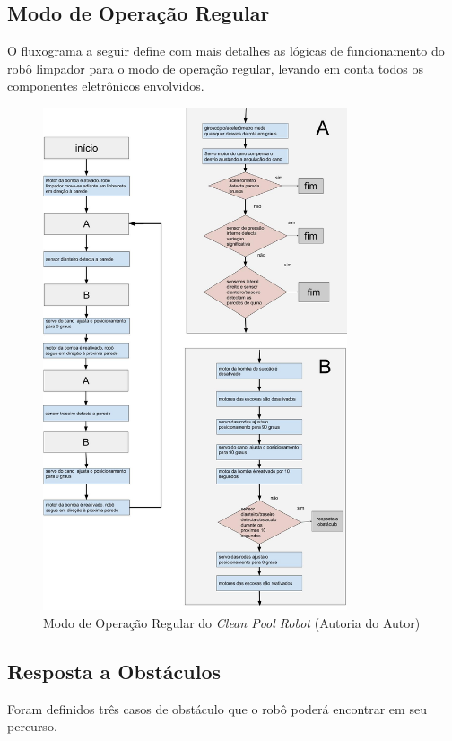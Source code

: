 \subsection{Modo de Operação Regular}
O fluxograma a seguir define com mais detalhes as lógicas de funcionamento
do robô limpador para o modo de operação regular, levando em conta todos os
componentes eletrônicos envolvidos.
\par
\begin{figure}[h]
  \centering
  \includegraphics[width=0.8\textwidth]{figures/flow-regular-robot.jpg}
  \caption{Modo de Operação Regular do \textit{Clean Pool Robot} (\textsf{Autoria do Autor})}
  \label{fig:flow-regular-robot}
\end{figure}
\FloatBarrier

\subsection{Resposta a Obstáculos}
Foram definidos três casos de obstáculo que o robô poderá encontrar em seu percurso.

